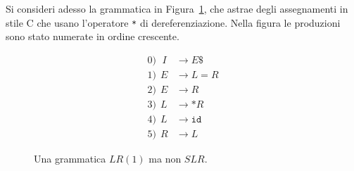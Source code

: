 Si  consideri adesso la grammatica in Figura~\ref{fig:c_grammar}, che
astrae degli assegnamenti in stile C che usano l'operatore \texttt{*} di
dereferenziazione. Nella figura le produzioni sono stato numerate in ordine
crescente.
%
\begin{figure}[t]
\begin{align*}
  0)\ \ \,I &\to E\mathtt{\$}\\
  1)\ \ E &\to L\mathtt{=}R\\
  2)\ \ E &\to R\\
  3)\ \ L &\to \mathtt{*}R\\
  4)\ \ L &\to \mathtt{id}\\
  5)\ \ R &\to L
\end{align*}
\caption{Una grammatica $\mathit{LR}(1)$ ma non $\mathit{SLR}$.}
  \label{fig:c_grammar}
\end{figure}
%
